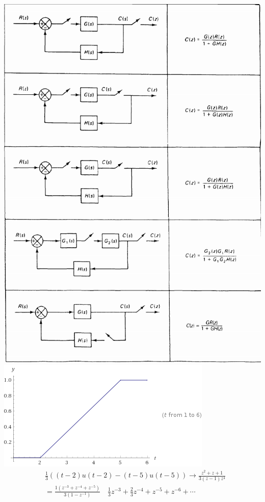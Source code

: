 \begin{multicols}{3}
\includegraphics[width=1\linewidth]{OgataTable.png}
\includegraphics[width=1\linewidth]{heavsidePlot.png}
\begin{align*}
& \frac{1}{3}((t-2)u(t-2)- (t-5)u(t-5)) \rightarrow \frac{z^2 + z + 1}{3 (z - 1) z^4} \\
& =
\frac{1(z^{-3}+z^{-4}+z^{-5})}{3(1-z^{-1})} \quad \frac{1}{3}z^{-3}+\frac{2}{3}z^{-4}+z^{-5}+z^{-6}+ \cdots 
\end{align*}
\end{multicols}

